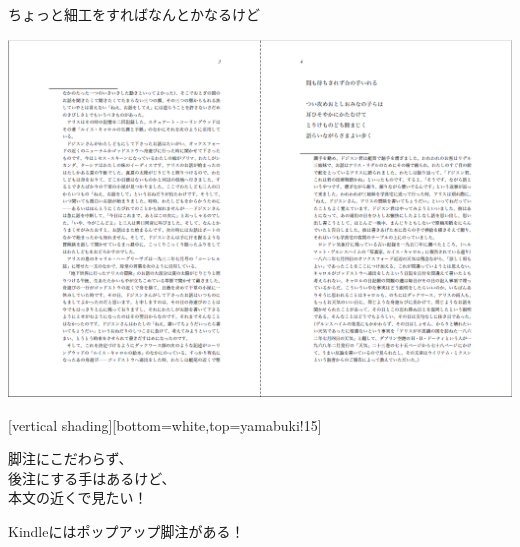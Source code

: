 \documentclass[14pt,dvipdfmx,uplatex]{beamer}
\begin{document}
\begin{frame}[t]{\inhibitglue ちょっと細工をすればなんとかなるけど}
  \sffamily
  \begin{center}
    \includegraphics[width=.9\textwidth]{alice-annotated-pagebreak-1.png}
  \end{center}
\end{frame}

[vertical shading][bottom=white,top=yamabuki!15]

\begin{frame}[plain]
  \begin{center}
    \color{black}\yasagoth
    脚注にこだわらず、\\
    後注にする手はあるけど、\\
    本文の近くで見たい！
  \end{center}
\end{frame}

\begin{frame}[t]{\inhibitglue Kindleにはポップアップ脚注がある！}
  \sffamily
  \begin{center}
  \end{center}
\end{frame}
\end{document}
